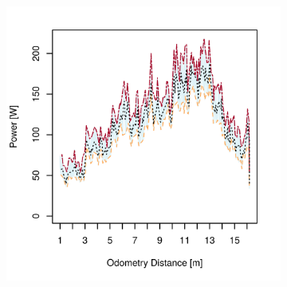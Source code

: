 \clearpage
\begin{figure}[h]
\captionsetup[subfigure]{justification=centering}
\vspace{-2ex}
	\centering
    \setlength{\subfigureWidth}{0.32\textwidth}
    \setlength{\graphicsHeight}{50mm}
    \hypersetup{hidelinks=true}%
	\begin{subfigure}[t]{\subfigureWidth}
        \centering
        \includegraphics[height=\graphicsHeight]{sections/power-system-design/power-budget/plots/locomotion-power-draw-on-upslope-terrain.png}
		\label{fig:plot:sub:sherpatt-disaggregated-upslope-terrain-power-draw-locomotion}
	\end{subfigure}\hfill
	\begin{subfigure}[t]{\subfigureWidth}
        \centering

\end{subfigure}
\end{figure}
